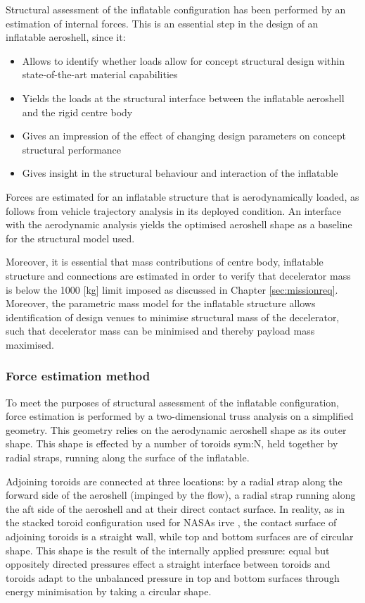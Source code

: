 Structural assessment of the inflatable configuration has been performed by an estimation of internal forces. This is an essential step in the design of an inflatable aeroshell, since it:
\begin{itemize}
\item Allows to identify whether loads allow for concept structural design within state-of-the-art material capabilities
\item Yields the loads at the structural interface between the inflatable aeroshell and the rigid centre body
\item Gives an impression of the effect of changing design parameters on concept structural performance
\item Gives insight in the structural behaviour and interaction of the inflatable
\end{itemize}
Forces are estimated for an inflatable structure that is aerodynamically loaded, as follows from vehicle trajectory analysis in its deployed condition. An interface with the aerodynamic analysis yields the optimised aeroshell shape as a baseline for the structural model used. 

Moreover, it is essential that mass contributions of centre body, inflatable structure and connections are estimated in order to verify that decelerator mass is below the 1000 [kg] limit imposed as discussed in Chapter \ref{sec:missionreq}. Moreover, the parametric mass model for the inflatable structure allows identification of design venues to minimise structural mass of the decelerator, such that decelerator mass can be minimised and thereby payload mass maximised. 

\subsubsection{Force estimation method}

To meet the purposes of structural assessment of the inflatable configuration, force estimation is performed by a two-dimensional truss analysis on a simplified geometry. This geometry relies on the aerodynamic aeroshell shape as its outer shape. This shape is effected by a number of toroids \gls{sym:N}, held together by radial straps, running along the surface of the inflatable. 

Adjoining toroids are connected at three locations: by a radial strap along the forward side of the aeroshell (impinged by the flow), a radial strap running along the aft side of the aeroshell and at their direct contact surface. In reality, as in the stacked toroid configuration used for NASAs \gls{irve} \cite{Lindell2006}, the contact surface of adjoining toroids is a straight wall, while top and bottom surfaces are of circular shape. This shape is the result of the internally applied pressure: equal but oppositely directed pressures effect a straight interface between toroids and toroids adapt to the unbalanced pressure in top and bottom surfaces through energy minimisation by taking a circular shape.

